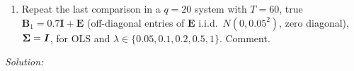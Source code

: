 \documentclass[11pt,a4paper]{article}
\newif\ifsolucoes
\newcommand{\espacoresol}{4.5cm}   %
\newcommand{\resolespaco}{\ifsolucoes\else\par\textit{Solution:}\vspace{\espacoresol}\par\fi}
\begin{document}
\begin{enumerate}[label=(\alph*),leftmargin=2em]
$\bm\Omega_0=\mathrm{diag}(\lambda^2/s_1^2,\lambda^2/s_2^2,\lambda^2/s_3^2)$ with $s_j^2$ the residual variance of a
univariate AR(1) for $y_j$, $\nu_0=q+2$, $\bm S_0=\mathrm{diag}(s_j^2)$. Compute the OLS estimate and, for $\lambda=0.2$, the
posterior mean and standard deviations of $\bm B_1$ and $E(\bSigma\mid\bm Y)$. Then tabulate, for
$\lambda\in\{0.01,0.1,0.2,0.5,1,10\}$, the posterior means of $B_{1,11}$ and $B_{1,12}$ and the Frobenius distances of the
posterior mean to $\bm I$, to OLS and to the true $\bm B_1$.
\item Repeat the last comparison in a $q=20$ system with $T=60$, true $\bm B_1=0.7\bm I+\bm E$ (off-diagonal entries of $\bm E$
i.i.d.\ $N(0,0.05^2)$, zero diagonal), $\bm{\Sigma}=\bm I$, for OLS and $\lambda\in\{0.05,0.1,0.2,0.5,1\}$. Comment.
\end{enumerate}
\resolespaco
\end{document}
